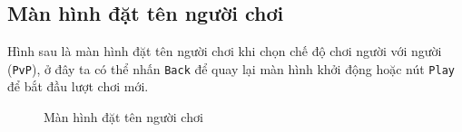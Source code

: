 \subsection{Màn hình đặt tên người chơi}
Hình sau là màn hình đặt tên người chơi khi chọn chế độ chơi người với người (\verb|PvP|), ở đây ta có thể nhấn \verb|Back| để quay lại màn hình khởi động hoặc nút \verb|Play| để bắt đầu lượt chơi mới.
\begin{figure}[H]
\caption{Màn hình đặt tên người chơi}
\end{figure}
